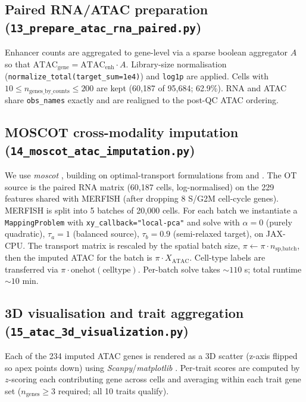 \documentclass[11pt,a4paper]{article}
\begin{document}
\subsection{Paired RNA/ATAC preparation
(\texttt{13\_prepare\_atac\_rna\_paired.py})}
Enhancer counts are aggregated to gene-level via a sparse boolean aggregator
\(A\) so that \(\mathrm{ATAC}_\mathrm{gene}=\mathrm{ATAC}_\mathrm{enh}\!\cdot\!A\).
Library-size normalisation
(\texttt{normalize\_total(target\_sum=1e4)}) and \texttt{log1p} are applied.
Cells with \(10\le n_\text{genes\_by\_counts}\le 200\) are kept (60{,}187 of
95{,}684; 62.9\%). RNA and ATAC share \texttt{obs\_names} exactly and are
realigned to the post-QC ATAC ordering.

\subsection{MOSCOT cross-modality imputation
(\texttt{14\_moscot\_atac\_imputation.py})}
We use \emph{moscot} \citep{klein2025moscot}, building on optimal-transport
formulations from \citet{schiebinger2019waddingtonot} and
\citet{demetci2022scot}. The OT source is the paired RNA matrix (60{,}187
cells, log-normalised) on the 229 features shared with MERFISH (after dropping
8 S/G2M cell-cycle genes). MERFISH is split into 5 batches of 20{,}000 cells.
For each batch we instantiate a \texttt{MappingProblem} with
\texttt{xy\_callback="local-pca"} and solve with \(\alpha=0\) (purely
quadratic), \(\tau_a=1\) (balanced source), \(\tau_b=0.9\) (semi-relaxed
target), on JAX-CPU. The transport matrix is rescaled by the spatial batch
size, \(\pi \leftarrow \pi \cdot n_{\text{sp,batch}}\), then the imputed ATAC
for the batch is \(\pi\!\cdot\!X_\text{ATAC}\). Cell-type labels are
transferred via \(\pi\!\cdot\!\mathrm{onehot}(\text{celltype})\). Per-batch
solve takes \(\sim\!110\) s; total runtime \(\sim\!10\) min.

\subsection{3D visualisation and trait aggregation
(\texttt{15\_atac\_3d\_visualization.py})}
Each of the 234 imputed ATAC genes is rendered as a 3D scatter (z-axis flipped
so apex points down) using \emph{Scanpy}/\emph{matplotlib}
\citep{wolf2018scanpy,virshup2023scverse}. Per-trait scores are computed by
\(z\)-scoring each contributing gene across cells and averaging within each
trait gene set (\(n_\text{genes}\!\ge\!3\) required; all 10 traits qualify).
\end{document}
